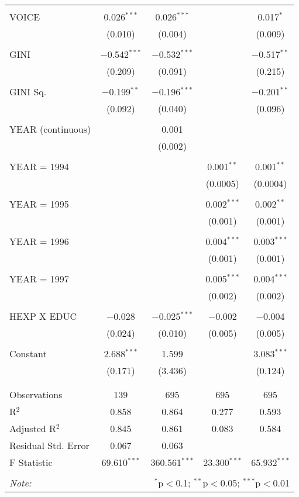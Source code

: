 \documentclass[12pt,a4paper]{article}\usepackage[]{graphicx}\usepackage[]{color}
\begin{document}
\begin{table}[!htbp]
\begin{tabular}{@{\extracolsep{5pt}}lcccc}
  & & & & \\ 
 VOICE & 0.026$^{***}$ & 0.026$^{***}$ &  & 0.017$^{*}$ \\ 
  & (0.010) & (0.004) &  & (0.009) \\ 
  & & & & \\ 
 GINI & $-$0.542$^{***}$ & $-$0.532$^{***}$ &  & $-$0.517$^{**}$ \\ 
  & (0.209) & (0.091) &  & (0.215) \\ 
  & & & & \\ 
 GINI Sq. & $-$0.199$^{**}$ & $-$0.196$^{***}$ &  & $-$0.201$^{**}$ \\ 
  & (0.092) & (0.040) &  & (0.096) \\ 
  & & & & \\ 
 YEAR (continuous) &  & 0.001 &  &  \\ 
  &  & (0.002) &  &  \\ 
  & & & & \\ 
 YEAR = 1994 &  &  & 0.001$^{**}$ & 0.001$^{**}$ \\ 
  &  &  & (0.0005) & (0.0004) \\ 
  & & & & \\ 
 YEAR = 1995 &  &  & 0.002$^{***}$ & 0.002$^{**}$ \\ 
  &  &  & (0.001) & (0.001) \\ 
  & & & & \\ 
 YEAR = 1996 &  &  & 0.004$^{***}$ & 0.003$^{***}$ \\ 
  &  &  & (0.001) & (0.001) \\ 
  & & & & \\ 
 YEAR = 1997 &  &  & 0.005$^{***}$ & 0.004$^{***}$ \\ 
  &  &  & (0.002) & (0.002) \\ 
  & & & & \\ 
 HEXP X EDUC & $-$0.028 & $-$0.025$^{***}$ & $-$0.002 & $-$0.004 \\ 
  & (0.024) & (0.010) & (0.005) & (0.005) \\ 
  & & & & \\ 
 Constant & 2.688$^{***}$ & 1.599 &  & 3.083$^{***}$ \\ 
  & (0.171) & (3.436) &  & (0.124) \\ 
  & & & & \\ 
\hline \\[-1.8ex] 
Observations & 139 & 695 & 695 & 695 \\ 
R$^{2}$ & 0.858 & 0.864 & 0.277 & 0.593 \\ 
Adjusted R$^{2}$ & 0.845 & 0.861 & 0.083 & 0.584 \\ 
Residual Std. Error & 0.067 & 0.063 &  &  \\ 
F Statistic & 69.610$^{***}$ & 360.561$^{***}$ & 23.300$^{***}$ & 65.932$^{***}$ \\ 
\hline 
\hline \\[-1.8ex] 
\textit{Note:}  & \multicolumn{4}{r}{$^{*}$p$<$0.1; $^{**}$p$<$0.05; $^{***}$p$<$0.01} \\ 
\end{tabular} 
\end{table} 
\end{document}
